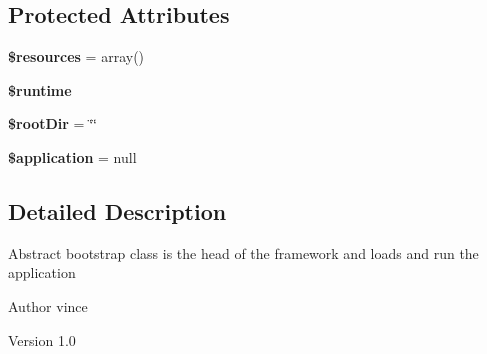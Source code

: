 \subsection*{Protected Attributes}
\begin{DoxyCompactItemize}
\item 
\hypertarget{class_anemo_1_1_application_1_1_bootstrap_1_1_bootstrap_abstract_ad57e7e99506ffd448d98e036b1a8da50}{
{\bfseries \$resources} = array()}
\label{class_anemo_1_1_application_1_1_bootstrap_1_1_bootstrap_abstract_ad57e7e99506ffd448d98e036b1a8da50}

\item 
\hypertarget{class_anemo_1_1_application_1_1_bootstrap_1_1_bootstrap_abstract_a848d6f39ddf52949fc0c10cbc0159188}{
{\bfseries \$runtime}}
\label{class_anemo_1_1_application_1_1_bootstrap_1_1_bootstrap_abstract_a848d6f39ddf52949fc0c10cbc0159188}

\item 
\hypertarget{class_anemo_1_1_application_1_1_bootstrap_1_1_bootstrap_abstract_a68ccc223df2708efe11893f675abdacf}{
{\bfseries \$rootDir} = \char`\"{}\char`\"{}}
\label{class_anemo_1_1_application_1_1_bootstrap_1_1_bootstrap_abstract_a68ccc223df2708efe11893f675abdacf}

\item 
\hypertarget{class_anemo_1_1_application_1_1_bootstrap_1_1_bootstrap_abstract_a537fa9b460dddc2a67074faab810398a}{
{\bfseries \$application} = null}
\label{class_anemo_1_1_application_1_1_bootstrap_1_1_bootstrap_abstract_a537fa9b460dddc2a67074faab810398a}

\end{DoxyCompactItemize}


\subsection{Detailed Description}
Abstract bootstrap class is the head of the framework and loads and run the application  \begin{DoxyAuthor}{Author}
vince 
\end{DoxyAuthor}
\begin{DoxyVersion}{Version}
1.0 
\end{DoxyVersion}


